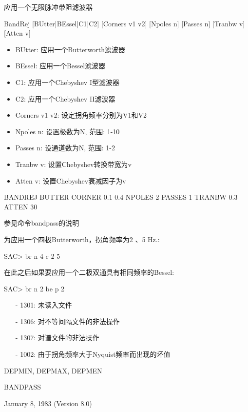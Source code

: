 \label{cmd:bandrej}

应用一个无限脉冲带阻滤波器

BandRej [BUtter|BEssel|C1|C2] [Corners v1 v2] [Npoles n] [Passes n] [Tranbw v] [Atten v]

\begin{itemize}
\item BUtter: 应用一个Butterworth滤波器
\item BEssel:  应用一个Bessel滤波器
\item C1: 应用一个Chebyshev I型滤波器
\item C2: 应用一个Chebyshev II滤波器
\item Corners v1 v2: 设定拐角频率分别为V1和V2
\item Npoles n: 设置极数为N, 范围: 1-10
\item Passes n: 设通道数为N, 范围: 1-2
\item Tranbw v: 设置Chebyshev转换带宽为v
\item Atten v: 设置Chebyshev衰减因子为v
\end{itemize}

BANDREJ BUTTER CORNER 0.1 0.4 NPOLES 2 PASSES 1 TRANBW 0.3 ATTEN 30

参见命令bandpass的说明

为应用一个四极Butterworth，拐角频率为2 、5 Hz.:
\begin{SACCode}
SAC> br n 4 c 2 5
\end{SACCode}
在此之后如果要应用一个二极双通具有相同频率的Bessel:
\begin{SACCode}
SAC> br n 2 be p 2
\end{SACCode}

\begin{itemize}
\item[-]1301: 未读入文件
\item[-]1306: 对不等间隔文件的非法操作
\item[-]1307: 对谱文件的非法操作
\item[-] 1002: 由于拐角频率大于Nyquist频率而出现的坏值
\end{itemize}

DEPMIN, DEPMAX, DEPMEN

BANDPASS

January 8, 1983 (Version 8.0)
